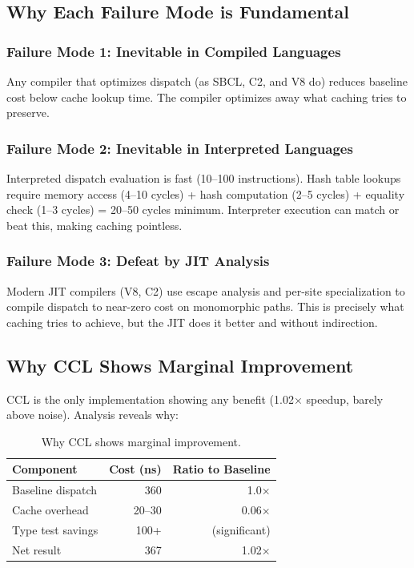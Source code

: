 \documentclass[sigplan,final]{acmart}
\begin{document}
\subsection{Why Each Failure Mode is Fundamental}

\subsubsection{Failure Mode 1: Inevitable in Compiled Languages}

Any compiler that optimizes dispatch (as SBCL, C2, and V8 do) reduces baseline cost below cache
lookup time. The compiler optimizes away what caching tries to preserve.

\subsubsection{Failure Mode 2: Inevitable in Interpreted Languages}

Interpreted dispatch evaluation is fast (10--100 instructions). Hash table lookups require memory
access (4--10 cycles) + hash computation (2--5 cycles) + equality check (1--3 cycles) = 20--50
cycles minimum. Interpreter execution can match or beat this, making caching pointless.

\subsubsection{Failure Mode 3: Defeat by JIT Analysis}

Modern JIT compilers (V8, C2) use escape analysis and per-site specialization to compile dispatch
to near-zero cost on monomorphic paths. This is precisely what caching tries to achieve, but the
JIT does it better and without indirection.

\subsection{Why CCL Shows Marginal Improvement}

CCL is the only implementation showing any benefit (1.02× speedup, barely above noise). Analysis
reveals why:

\begin{table}[h]
\centering
\caption{Why CCL shows marginal improvement.}
\label{tab:ccl}
\begin{tabular}{@{}lrr@{}}
\toprule
\textbf{Component} & \textbf{Cost (ns)} & \textbf{Ratio to Baseline} \\
\midrule
Baseline dispatch & 360 & 1.0× \\
Cache overhead & 20--30 & 0.06× \\
Type test savings & 100+ & (significant) \\
Net result & 367 & 1.02× \\
\bottomrule
\end{tabular}
\end{table}
\end{document}
